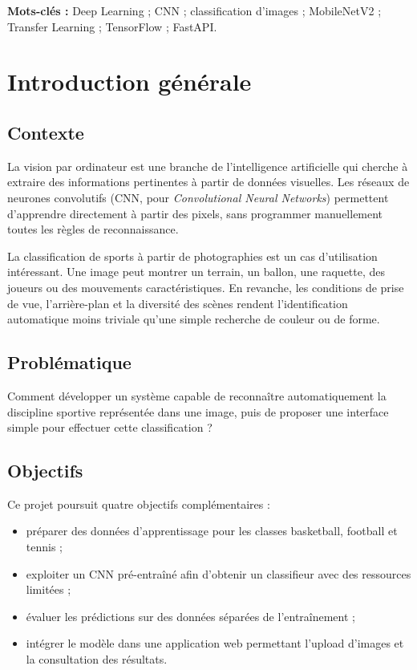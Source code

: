 \documentclass[11pt,a4paper,oneside]{report}
\begin{document}
\textbf{Mots-clés :} Deep Learning ; CNN ; classification d'images ; MobileNetV2 ; Transfer Learning ; TensorFlow ; FastAPI.

\tableofcontents
\clearpage
{}

\chapter{Introduction générale}
\section{Contexte}
La vision par ordinateur est une branche de l'intelligence artificielle qui cherche à extraire des informations pertinentes à partir de données visuelles. Les réseaux de neurones convolutifs (CNN, pour \emph{Convolutional Neural Networks}) permettent d'apprendre directement à partir des pixels, sans programmer manuellement toutes les règles de reconnaissance.

La classification de sports à partir de photographies est un cas d'utilisation intéressant. Une image peut montrer un terrain, un ballon, une raquette, des joueurs ou des mouvements caractéristiques. En revanche, les conditions de prise de vue, l'arrière-plan et la diversité des scènes rendent l'identification automatique moins triviale qu'une simple recherche de couleur ou de forme.
\section{Problématique}
Comment développer un système capable de reconnaître automatiquement la discipline sportive représentée dans une image, puis de proposer une interface simple pour effectuer cette classification ?
\section{Objectifs}
Ce projet poursuit quatre objectifs complémentaires :
\begin{itemize}
\item préparer des données d'apprentissage pour les classes basketball, football et tennis ;
\item exploiter un CNN pré-entraîné afin d'obtenir un classifieur avec des ressources limitées ;
\item évaluer les prédictions sur des données séparées de l'entraînement ;
\item intégrer le modèle dans une application web permettant l'upload d'images et la consultation des résultats.
\end{itemize}
\end{document}
